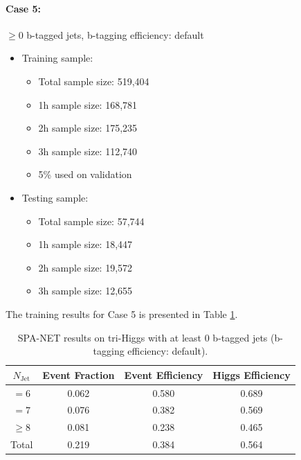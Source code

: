 \documentclass[12pt]{article}
\begin{document}
		\paragraph{Case 5:} $\ge 0$ b-tagged jets, b-tagging efficiency: default 
		\begin{itemize}
			\item Training sample:
			\begin{itemize}
				\item Total sample size: 519,404
				\item 1h sample size: 168,781
				\item 2h sample size: 175,235
				\item 3h sample size: 112,740
				\item 5\% used on validation
			\end{itemize}
			\item Testing sample: 
				\begin{itemize}
					\item Total sample size: 57,744
					\item 1h sample size: 18,447
					\item 2h sample size: 19,572
					\item 3h sample size: 12,655
				\end{itemize}
		\end{itemize}
		The training results for Case 5 is presented in Table \ref{tab:SPANet_triHiggs_0btag_default}.
		\begin{table}[htpb]
			\centering
			\caption{SPA-NET results on tri-Higgs with at least 0 b-tagged jets (b-tagging efficiency: default).}
			\label{tab:SPANet_triHiggs_0btag_default}
			\begin{tabular}{c|c|cc}
				$N_\text{Jet}$ & Event Fraction & Event Efficiency & Higgs Efficiency \\
				\hline
				$=6$	  &   0.062             &    0.580              &    0.689             \\
				$=7$	  &   0.076             &    0.382              &    0.569             \\
				$\ge 8$	  &   0.081             &    0.238              &    0.465             \\
				Total	  &   0.219             &    0.384              &    0.564             \\
			\end{tabular}
		\end{table}
\end{document}
